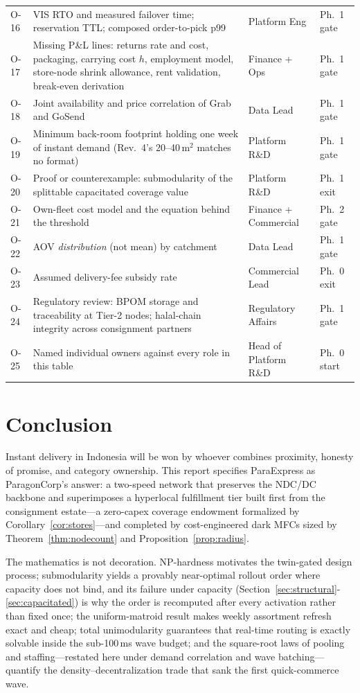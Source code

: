 \documentclass[10pt,twocolumn,letterpaper]{article}
\theoremstyle{definition}
\begin{document}
\begin{table}[t]
\begin{tabular}{@{}p{0.5cm}p{4.0cm}p{1.5cm}p{1.0cm}@{}}
O-16 & VIS RTO and measured failover time; reservation TTL; composed order-to-pick p99 & Platform Eng & Ph.\ 1 gate\\
O-17 & Missing P\&L lines: returns rate and cost, packaging, carrying cost $h$, employment model, store-node shrink allowance, rent validation, break-even derivation & Finance + Ops & Ph.\ 1 gate\\
O-18 & Joint availability and price correlation of Grab and GoSend & Data Lead & Ph.\ 1 gate\\
O-19 & Minimum back-room footprint holding one week of instant demand (Rev.~4's 20--40\,m$^2$ matches no format) & Platform R\&D & Ph.\ 1 gate\\
O-20 & Proof or counterexample: submodularity of the splittable capacitated coverage value & Platform R\&D & Ph.\ 1 exit\\
O-21 & Own-fleet cost model and the equation behind the threshold & Finance + Commercial & Ph.\ 2 gate\\
O-22 & AOV \emph{distribution} (not mean) by catchment & Data Lead & Ph.\ 1 gate\\
O-23 & Assumed delivery-fee subsidy rate & Commercial Lead & Ph.\ 0 exit\\
O-24 & Regulatory review: BPOM storage and traceability at Tier-2 nodes; halal-chain integrity across consignment partners & Regulatory Affairs & Ph.\ 1 gate\\
O-25 & Named individual owners against every role in this table & Head of Platform R\&D & Ph.\ 0 start\\
\bottomrule
\end{tabular}
\end{table}

\section{Conclusion}

Instant delivery in Indonesia will be won by whoever combines proximity, honesty of promise, and category ownership. This report specifies ParaExpress as ParagonCorp's answer: a two-speed network that preserves the NDC/DC backbone and superimposes a hyperlocal fulfillment tier built first from the consignment estate---a zero-capex coverage endowment formalized by Corollary~\ref{cor:stores}---and completed by cost-engineered dark MFCs sized by Theorem~\ref{thm:nodecount} and Proposition~\ref{prop:radius}.

The mathematics is not decoration. NP-hardness motivates the twin-gated design process; submodularity yields a provably near-optimal rollout order where capacity does not bind, and its failure under capacity (Section~\ref{sec:structural}-\ref{sec:capacitated}) is why the order is recomputed after every activation rather than fixed once; the uniform-matroid result makes weekly assortment refresh exact and cheap; total unimodularity guarantees that real-time routing is exactly solvable inside the sub-100\,ms wave budget; and the square-root laws of pooling and staffing---restated here under demand correlation and wave batching---quantify the density--decentralization trade that sank the first quick-commerce wave.
\end{document}
